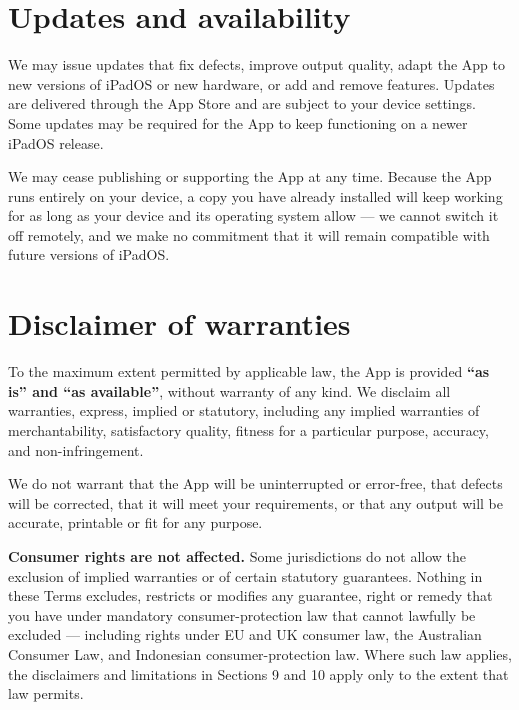 \documentclass[11pt]{article}
\begin{document}
\section{Updates and availability}

We may issue updates that fix defects, improve output quality, adapt the App to new
versions of iPadOS or new hardware, or add and remove features. Updates are delivered
through the App Store and are subject to your device settings. Some updates may be
required for the App to keep functioning on a newer iPadOS release.

We may cease publishing or supporting the App at any time. Because the App runs
entirely on your device, a copy you have already installed will keep working for as
long as your device and its operating system allow — we cannot switch it off
remotely, and we make no commitment that it will remain compatible with future
versions of iPadOS.

\section{Disclaimer of warranties}

To the maximum extent permitted by applicable law, the App is provided \textbf{“as
is” and “as available”}, without warranty of any kind. We disclaim all warranties,
express, implied or statutory, including any implied warranties of merchantability,
satisfactory quality, fitness for a particular purpose, accuracy, and non-infringement.

We do not warrant that the App will be uninterrupted or error-free, that defects will
be corrected, that it will meet your requirements, or that any output will be accurate,
printable or fit for any purpose.

\begin{plainbox}
\uifont\small
\textbf{Consumer rights are not affected.} Some jurisdictions do not allow the
exclusion of implied warranties or of certain statutory guarantees. Nothing in these
Terms excludes, restricts or modifies any guarantee, right or remedy that you have
under mandatory consumer-protection law that cannot lawfully be excluded — including
rights under EU and UK consumer law, the Australian Consumer Law, and Indonesian
consumer-protection law. Where such law applies, the disclaimers and limitations in
Sections 9 and 10 apply only to the extent that law permits.
\end{plainbox}
\end{document}
